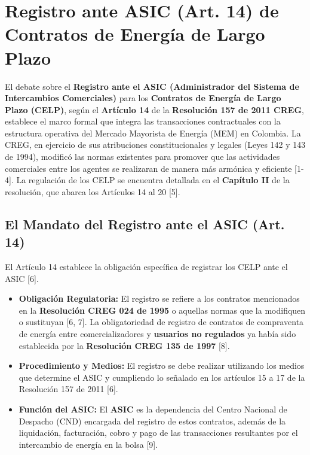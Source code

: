 \documentclass[a5paper]{book}%
\begin{document}
\section{Registro ante ASIC (Art. 14) de Contratos de Energía de Largo Plazo}

El debate sobre el \textbf{Registro ante el ASIC (Administrador del Sistema de Intercambios Comerciales)} para los \textbf{Contratos de Energía de Largo Plazo (CELP)}, según el \textbf{Artículo 14} de la \textbf{Resolución 157 de 2011 CREG}, establece el marco formal que integra las transacciones contractuales con la estructura operativa del Mercado Mayorista de Energía (MEM) en Colombia. La CREG, en ejercicio de sus atribuciones constitucionales y legales (Leyes 142 y 143 de 1994), modificó las normas existentes para promover que las actividades comerciales entre los agentes se realizaran de manera más armónica y eficiente [1-4]. La regulación de los CELP se encuentra detallada en el \textbf{Capítulo II} de la resolución, que abarca los Artículos 14 al 20 [5].

\subsection{El Mandato del Registro ante el ASIC (Art. 14)}

El Artículo 14 establece la obligación específica de registrar los CELP ante el ASIC [6].

\begin{itemize}
	\item \textbf{Obligación Regulatoria:} El registro se refiere a los contratos mencionados en la \textbf{Resolución CREG 024 de 1995} o aquellas normas que la modifiquen o sustituyan [6, 7]. La obligatoriedad de registro de contratos de compraventa de energía entre comercializadores y \textbf{usuarios no regulados} ya había sido establecida por la \textbf{Resolución CREG 135 de 1997} [8].
	\item \textbf{Procedimiento y Medios:} El registro se debe realizar utilizando los medios que determine el ASIC y cumpliendo lo señalado en los artículos 15 a 17 de la Resolución 157 de 2011 [6].
	\item \textbf{Función del ASIC:} El \textbf{ASIC} es la dependencia del Centro Nacional de Despacho (CND) encargada del registro de estos contratos, además de la liquidación, facturación, cobro y pago de las transacciones resultantes por el intercambio de energía en la bolsa [9].
\end{itemize}
\end{document}
